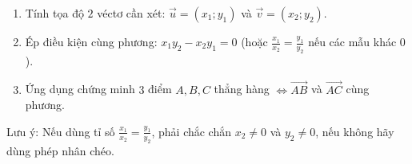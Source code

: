 \begin{enumerate}
\item Tính tọa độ $2$ véctơ cần xét: $\overrightarrow{u} = (x_1; y_1)$ và $\overrightarrow{v} = (x_2; y_2)$.
\item Ép điều kiện cùng phương: $x_1 y_2 - x_2 y_1 = 0$ (hoặc $\frac{x_1}{x_2} = \frac{y_1}{y_2}$ nếu các mẫu khác $0$).
\item Ứng dụng chứng minh $3$ điểm $A, B, C$ thẳng hàng $\Leftrightarrow \overrightarrow{AB}$ và $\overrightarrow{AC}$ cùng phương.
\end{enumerate}
Lưu ý: Nếu dùng tỉ số $\frac{x_1}{x_2} = \frac{y_1}{y_2}$, phải chắc chắn $x_2 \neq 0$ và $y_2 \neq 0$, nếu không hãy dùng phép nhân chéo.
